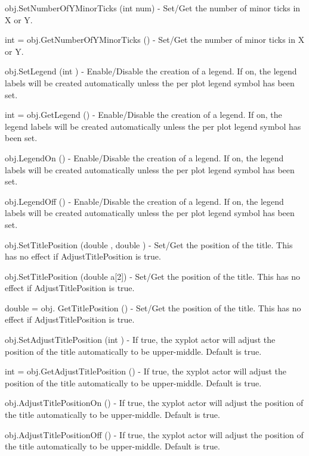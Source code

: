 \begin{DoxyItemize}
\item {\ttfamily obj.\-Set\-Number\-Of\-Y\-Minor\-Ticks (int num)} -\/ Set/\-Get the number of minor ticks in X or Y.  
\item {\ttfamily int = obj.\-Get\-Number\-Of\-Y\-Minor\-Ticks ()} -\/ Set/\-Get the number of minor ticks in X or Y.  
\item {\ttfamily obj.\-Set\-Legend (int )} -\/ Enable/\-Disable the creation of a legend. If on, the legend labels will be created automatically unless the per plot legend symbol has been set.  
\item {\ttfamily int = obj.\-Get\-Legend ()} -\/ Enable/\-Disable the creation of a legend. If on, the legend labels will be created automatically unless the per plot legend symbol has been set.  
\item {\ttfamily obj.\-Legend\-On ()} -\/ Enable/\-Disable the creation of a legend. If on, the legend labels will be created automatically unless the per plot legend symbol has been set.  
\item {\ttfamily obj.\-Legend\-Off ()} -\/ Enable/\-Disable the creation of a legend. If on, the legend labels will be created automatically unless the per plot legend symbol has been set.  
\item {\ttfamily obj.\-Set\-Title\-Position (double , double )} -\/ Set/\-Get the position of the title. This has no effect if Adjust\-Title\-Position is true.  
\item {\ttfamily obj.\-Set\-Title\-Position (double a\mbox{[}2\mbox{]})} -\/ Set/\-Get the position of the title. This has no effect if Adjust\-Title\-Position is true.  
\item {\ttfamily double = obj. Get\-Title\-Position ()} -\/ Set/\-Get the position of the title. This has no effect if Adjust\-Title\-Position is true.  
\item {\ttfamily obj.\-Set\-Adjust\-Title\-Position (int )} -\/ If true, the xyplot actor will adjust the position of the title automatically to be upper-\/middle. Default is true.  
\item {\ttfamily int = obj.\-Get\-Adjust\-Title\-Position ()} -\/ If true, the xyplot actor will adjust the position of the title automatically to be upper-\/middle. Default is true.  
\item {\ttfamily obj.\-Adjust\-Title\-Position\-On ()} -\/ If true, the xyplot actor will adjust the position of the title automatically to be upper-\/middle. Default is true.  
\item {\ttfamily obj.\-Adjust\-Title\-Position\-Off ()} -\/ If true, the xyplot actor will adjust the position of the title automatically to be upper-\/middle. Default is true.  

\end{DoxyItemize}
